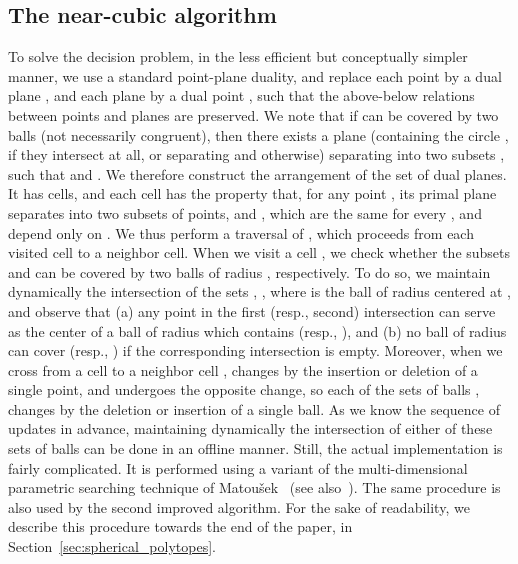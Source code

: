\documentclass[a4paper,12pt]{article}
\begin{document}
\subsection{The near-cubic algorithm}
\label{subsec:n^3_sketch} To solve the decision problem, in the less
efficient but conceptually simpler manner, we use a standard
point-plane duality, and replace each point  by a dual
plane , and each plane  by a dual point , such that the
above-below relations between points and planes are preserved. We
note that if  can be covered by two balls  (not
necessarily congruent), then there exists a plane  (containing
the circle , if they intersect at all, or
separating  and  otherwise) separating  into two
subsets , such that  and . We therefore construct the arrangement  of the set  of dual planes. It has  cells, and each cell
 has the property that, for any point , its primal
plane  separates  into two subsets of points,  and
, which are the same for every , and depend
only on . We thus perform a traversal of , which proceeds
from each visited cell to a neighbor cell. When we visit a cell
, we check whether the subsets  and  can
be covered by two balls of radius , respectively. To do so, we
maintain dynamically the intersection of the sets , , where  is
the ball of radius  centered at , and observe that (a) any
point in the first (resp., second) intersection can serve as the
center of a ball of radius  which contains  (resp.,
), and (b) no ball of radius  can cover 
(resp., ) if the corresponding intersection is empty.
Moreover, when we cross from a cell  to a neighbor cell
,  changes by the insertion or deletion of a single
point, and  undergoes the opposite change, so each of the
sets of balls ,  changes by the deletion or insertion of a single ball.
As we know the sequence of updates in advance, maintaining
dynamically the intersection of either of these sets of balls can be
done in an offline manner. Still, the actual implementation is
fairly complicated. It is performed using a variant of the
multi-dimensional parametric searching technique of
Matou\v{s}ek~\cite{JM} (see also~\cite{TCA, CMS, NPT}). The same
procedure is also used by the second improved algorithm. For the
sake of readability, we describe this procedure towards the end of
the paper, in Section~\ref{sec:spherical_polytopes}.
\end{document}
